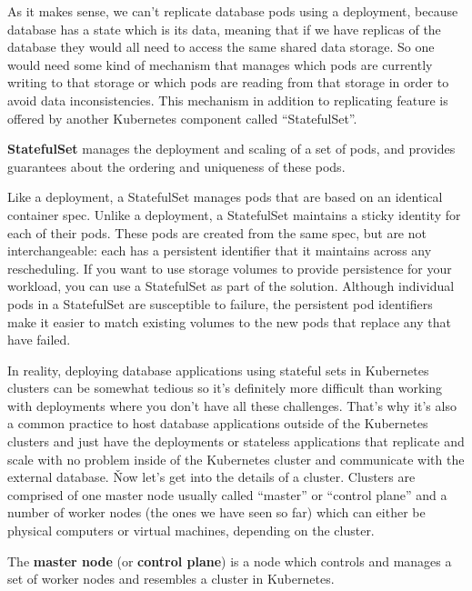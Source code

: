 As it makes sense, we can't replicate database pods using a deployment, because database has a state which is its
data, meaning that if we have replicas of the database they would all need to access the same shared data storage. So
one would need some kind of mechanism that manages which pods are currently writing to that storage or which pods are
reading from that storage in order to avoid data inconsistencies. This mechanism in addition to replicating feature
is offered by another Kubernetes component called ``StatefulSet''.

\bd[StatefulSet]
\textbf{StatefulSet} manages the deployment and scaling of a set of pods, and provides guarantees about the ordering and
uniqueness of these pods.
\ed

Like a deployment, a StatefulSet manages pods that are based on an identical container spec. Unlike a deployment, a
StatefulSet maintains a sticky identity for each of their pods. These pods are created from the same spec, but are
not interchangeable: each has a persistent identifier that it maintains across any rescheduling. If you want to use
storage volumes to provide persistence for your workload, you can use a StatefulSet as part of the solution. Although
individual pods in a StatefulSet are susceptible to failure, the persistent pod identifiers make it easier to match
existing volumes to the new pods that replace any that have failed.


In reality, deploying database applications using stateful sets in Kubernetes clusters can be somewhat tedious so
it's definitely more difficult than working with deployments where you don't have all these challenges. That's why
it's also a common practice to host database applications outside of the Kubernetes clusters and just have the
deployments or stateless applications that replicate and scale with no problem inside of the Kubernetes cluster and
communicate with the external database. \v

Now let's get into the details of a cluster. Clusters are comprised of one master node usually called ``master'' or
``control plane'' and a number of worker nodes (the ones we have seen so far) which can either be physical computers
or virtual machines, depending on the cluster.

The \textbf{master node} (or \textbf{control plane}) is a node which controls and manages a set of worker nodes and
resembles a cluster in Kubernetes.
\ed

